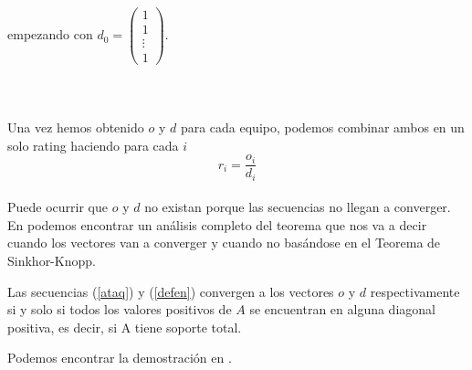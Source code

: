 empezando con
$d_{0}=
\left(\begin{array}{c}
1\\
1\\
\vdots \\
1
\end{array} \right) $.
\ \\
\ \\
\ \\
\ \\
Una vez hemos obtenido $o$ y $d$ para cada equipo, podemos combinar ambos en un solo rating haciendo para cada $i$
\begin{equation}
r_{i}= \dfrac{o_{i}}{d_{i}} \label{ODr}
\end{equation}
\ \\

Puede ocurrir que $o$ y $d$ no existan porque las secuencias no llegan a converger. En \cite[pág 87-90]{cap7} podemos encontrar un análisis completo del teorema que nos va a decir cuando los vectores van a converger y cuando no basándose en el Teorema de Sinkhor-Knopp.
\begin{teo}
	Las secuencias (\ref{ataq}) y (\ref{defen}) convergen a los vectores $o$ y $d$ respectivamente si y solo si todos los valores positivos de $A$ se encuentran en alguna diagonal positiva, es decir, si A tiene soporte total. 
\end{teo}
Podemos encontrar la demostración en \cite[pág 90-91]{cap7}.\\
    
